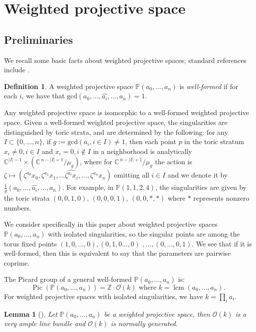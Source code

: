 \documentclass{amsart}
\newtheorem{lemma}[theorem]{Lemma}
\theoremstyle{definition}
\newtheorem{definition}[theorem]{Definition}
\theoremstyle{remark}
\begin{document}
\section{Weighted projective space} 
\subsection{Preliminaries} 

We recall some basic facts about weighted projective spaces; standard references include \cite{Dolgachev1982,Fletcher1989,Fulton1993}.
\begin{definition}
    A weighted projective space $\mathbb P(a_0, ... , a_n)$ is \emph{well-formed} if for each $i$, we have that $\mathrm{gcd}(a_0,...,\widehat{a_i},...,a_n)=1$.
\end{definition}

Any weighted projective space is isomorphic to a well-formed weighted projective space. Given a well-formed weighted projective space, the singularities are distinguished by toric strata, and are determined by the following: for any $I\subset \{0,...,n\}$, if $g:=\mathrm{gcd}(a_i, i\in I)\neq 1$, then each point $p$ in the toric stratum $x_i\neq 0, i\in I$ and $x_i =0, i\notin I$ in
a neighborhood is analytically  $\mathbb C^{|I|-1}\times (\mathbb C^{\,n-|I|+1}/\mu_g)$, where for $\mathbb C^{\,n-|I|+1}/\mu_g$ the action is $\zeta\mapsto(\zeta^{a_0} x_0, \zeta^{a_1} x_1,...\widehat{\zeta^{a_i} x_i},..., \zeta^{a_n} x_n)$ omitting all $i\in I$ and we denote it by $\frac 1g(a_0 , ..., \widehat{a_i},... ,a_n)$. For example, in $\mathbb{P}(1,1, 2,4)$, the singularities are given by the toric strata $(0,0,1,0)$, $(0,0,0,1)$, $(0,0,*,*)$ where $*$ represents nonzero numbers.

We consider specifically in this paper about weighted projective spaces $\mathbb{P}(a_0,\ldots,a_n)$ with isolated singularities, so the singular points are among the torus fixed points $(1,0,...,0), (0,1,0...,0)$ $,...,(0,...,0,1)$. We see that if it is well-formed, then this is equivalent to say that the parameters are pairwise coprime.  

The Picard group of a general well-formed $\mathbb{P}(a_0,\ldots,a_n)$ is:
\[ \operatorname{Pic}(\mathbb{P}(a_0,\ldots,a_n)) = \mathbb{Z} \cdot \mathcal{O}(k) \text{ where } k = \operatorname{lcm}(a_0,\ldots,a_n). \]
For weighted projective spaces with isolated singularities, we have $k = \prod_i a_i$.
\begin{lemma}[{\cite[Proposition 2.1, Example 5.1]{Keum1997}}]
Let $\mathbb P(a_0,...,a_n)$ be a weighted projective space, then $\mathcal O(k)$ is a very ample line bundle and $\mathcal O(k)$ is normally generated. 
\end{lemma}
\end{document}
